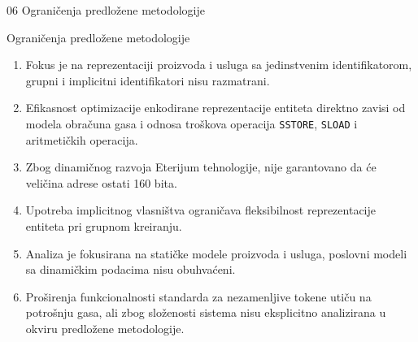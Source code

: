 
\sectionframe
    {06}
    {Ograničenja predložene metodologije}
    {}


\begin{frame}{Ograničenja predložene metodologije}

\begin{enumerate}
\item Fokus je na reprezentaciji proizvoda i usluga sa jedinstvenim identifikatorom, grupni i implicitni identifikatori nisu razmatrani.
\item Efikasnost optimizacije enkodirane reprezentacije entiteta direktno zavisi od modela obračuna gasa i odnosa troškova operacija \texttt{SSTORE}, \texttt{SLOAD} i aritmetičkih operacija.
\item Zbog dinamičnog razvoja Eterijum tehnologije, nije garantovano da će veličina adrese ostati 160 bita.
\item Upotreba implicitnog vlasništva ograničava fleksibilnost reprezentacije entiteta pri grupnom kreiranju.
\item Analiza je fokusirana na statičke modele proizvoda i usluga, poslovni modeli sa dinamičkim podacima nisu obuhvaćeni.
\item Proširenja funkcionalnosti standarda za nezamenljive tokene utiču na potrošnju gasa, ali zbog složenosti sistema nisu eksplicitno analizirana u okviru predložene metodologije.
\end{enumerate}

\end{frame}



